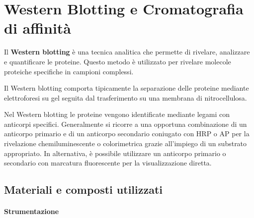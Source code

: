 \section{Western Blotting e Cromatografia di affinità}
Il \textbf{Western blotting} è una tecnica analitica che permette di rivelare, analizzare e quantificare le proteine. Questo metodo è utilizzato per rivelare molecole proteiche specifiche in campioni complessi.

Il Western blotting comporta tipicamente la separazione delle proteine mediante elettroforesi su gel seguita dal trasferimento su una membrana di nitrocellulosa.

Nel Western blotting le proteine vengono identificate mediante legami con anticorpi specifici. Generalmente si ricorre a una opportuna combinazione di un anticorpo primario e di un anticorpo secondario coniugato con HRP o AP per la rivelazione chemiluminescente o colorimetrica grazie all'impiego di un substrato appropriato. In alternativa, è possibile utilizzare un anticorpo primario o secondario con marcatura fluorescente per la visualizzazione diretta.

\subsection{Materiali e composti utilizzati}
\paragraph{Strumentazione}

